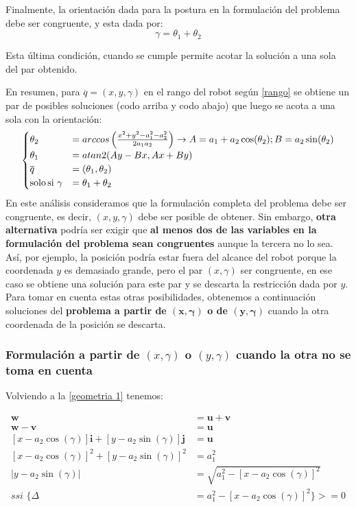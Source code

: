 \documentclass[a4paper,12pt]{article}
\begin{document}
Finalmente, la orientación dada para la postura en la formulación del problema debe ser congruente, y esta dada por:
\[\gamma = \theta_1 + \theta_2\]

Esta última condición, cuando se cumple permite acotar la solución a una sola del par obtenido.

En resumen, para $\overline{q} = (x, y, \gamma)$ en el rango del robot según \cref{rango} se obtiene un par de posibles soluciones (codo arriba y codo abajo) que luego se acota a una sola con la orientación:
\begin{align}
    \begin{cases}
        \theta_2 &= arccos\left(\frac{x^2 + y^2 - a_{1}^2 - a_{2}^2}{2a_{1}a_{2}}\right) \rightarrow A = a_1 + a_2\cos(\theta_2); B = a_2\sin(\theta_2)\\
        \theta_1 &=  atan2(Ay-Bx, Ax + By)\\
        \overline{q} &= (\theta_1, \theta_2)\\
        \text{solo\,si}\,\,\gamma &= \theta_1 + \theta_2
    \end{cases}
    \label{solucion ejercicio 1}
\end{align}
En este análisis consideramos que la formulación completa del problema debe ser congruente, es decir, $(x, y, \gamma)$ debe ser posible de obtener.
Sin embargo, \textbf{otra alternativa} podría ser exigir que \textbf{al menos dos de las variables en la formulación del problema sean congruentes} aunque la tercera no lo sea.
Así, por ejemplo, la posición podría estar fuera del alcance del robot porque la coordenada $y$ es demasiado grande, pero el par $(x, \gamma)$ ser congruente, en ese caso se obtiene una solución para este par y se descarta la restricción dada por $y$.
Para tomar en cuenta estas otras posibilidades, obtenemos a continuación soluciones del \textbf{problema a partir de $\mathbf{(x, \gamma)}$ o de $\mathbf{(y, \gamma)}$} cuando la otra coordenada de la posición se descarta.

\subsubsection{Formulación a partir de $(x, \gamma)$ o $(y, \gamma)$ cuando la otra no se toma en cuenta}
Volviendo a la \cref{geometria 1} tenemos:

\begin{align*}
    \mathbf{w} &= \mathbf{u} + \mathbf{v}\\
    \mathbf{w} - \mathbf{v} &= \mathbf{u}\\
    \left[x - a_2\cos(\gamma)\right]\mathbf{i} + \left[y - a_2\sin(\gamma)\right]\mathbf{j} &= \mathbf{u}\\
    \left[x - a_2\cos(\gamma)\right]^2 + \left[y - a_2\sin(\gamma)\right]^2 &= a_1^2\\
    |y - a_2\sin(\gamma)| &= \sqrt{a_1^2 - \left[x - a_2\cos(\gamma)\right]^2}\\
    ssi\,\,\{\Delta &= a_1^2 - \left[x - a_2\cos(\gamma)\right]^2\} >= 0
\end{align*}
\end{document}
